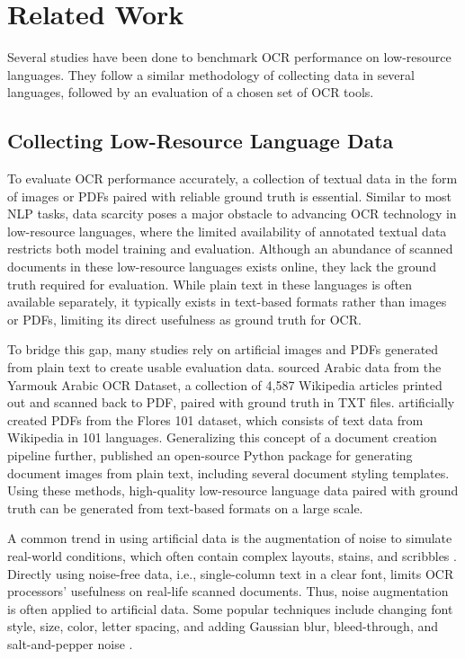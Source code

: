 \documentclass[12pt,oneside]{memoir}
\begin{document}
\chapter{Related Work}

Several studies have been done to benchmark OCR performance on low-resource languages.
They follow a similar methodology of collecting data in several languages, followed by an evaluation of a chosen set of OCR tools.

\section{Collecting Low-Resource Language Data}
To evaluate OCR performance accurately, a collection of textual data in the form of images or PDFs paired with reliable ground truth is essential.
Similar to most NLP tasks, data scarcity poses a major obstacle to advancing OCR technology in low-resource languages, where the limited availability of annotated textual data restricts both model training and evaluation.
Although an abundance of scanned documents in these low-resource languages exists online, they lack the ground truth required for evaluation.
While plain text in these languages is often available separately, it typically exists in text-based formats rather than images or PDFs, limiting its direct usefulness as ground truth for OCR.

To bridge this gap, many studies rely on artificial images and PDFs generated from plain text to create usable evaluation data.
\textcite{hegghammer-2022} sourced Arabic data from the Yarmouk Arabic OCR Dataset, a collection of 4,587 Wikipedia articles printed out and scanned back to PDF, paired with ground truth in TXT files.
\textcite{ignat-etal-2022} artificially created PDFs from the Flores 101 dataset, which consists of text data from Wikipedia in 101 languages.
Generalizing this concept of a document creation pipeline further, \textcite{gupte-etal-2021} published an open-source Python package for generating document images from plain text, including several document styling templates.
Using these methods, high-quality low-resource language data paired with ground truth can be generated from text-based formats on a large scale.

A common trend in using artificial data is the augmentation of noise to simulate real-world conditions, which often contain complex layouts, stains, and scribbles \parencite{hegghammer-2022}.
Directly using noise-free data, i.e., single-column text in a clear font, limits OCR processors' usefulness on real-life scanned documents.
Thus, noise augmentation is often applied to artificial data.
Some popular techniques include changing font style, size, color, letter spacing, and adding Gaussian blur, bleed-through, and salt-and-pepper noise \parencite{gupte-etal-2021, ignat-etal-2022}.
\end{document}
